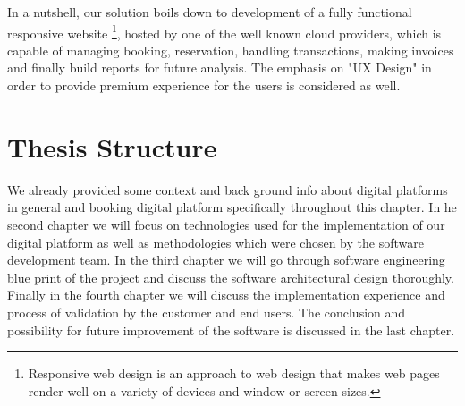 In a nutshell, our solution boils down to development of a fully functional responsive website \footnote{Responsive web design is an approach to web design that makes web pages render well on a variety of devices and window or screen sizes.}, hosted by one of the well known cloud providers, which is capable of managing booking, reservation, handling transactions, making invoices and finally build reports for future analysis. The emphasis on "UX Design" in order to provide premium experience for the users is considered as well.


\section{Thesis Structure}\label{sec:thesis_structure}
We already provided some context and back ground info about digital platforms in general and booking digital platform specifically throughout this  chapter. %
In he second chapter we will focus on technologies used for the implementation of our digital platform as well as methodologies which were chosen by the software development team.
In the third chapter we will go through software engineering blue print of the project and discuss the software architectural design thoroughly.
Finally in the fourth chapter we will discuss the implementation experience and process of validation by the customer and end users. The conclusion and possibility for future improvement of the software is discussed in the last chapter.


